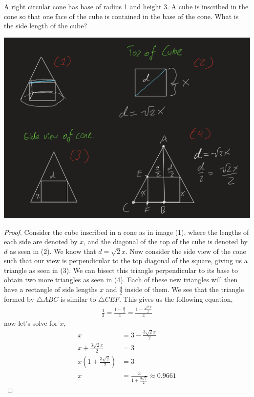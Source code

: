 \documentclass[11pt]{article}
\newenvironment{problem}[2][Problem\!]{\begin{trivlist}
\item[\hskip \labelsep {\bfseries #1}\hskip \labelsep {\bfseries #2}]}{\end{trivlist}}
\begin{document}
\newpage
\begin{tcolorbox}
    \begin{problem} {IC | 12-03 | PP 40}
        A right circular cone has base of radius 1 and height 3. A cube is inscribed in the cone so that one face of the cube is contained in the base of the cone. What is the side length of the cube?
    \end{problem}
\end{tcolorbox}
\includegraphics[scale=0.5]{diagram}
\begin{proof}
    Consider the cube inscribed in a cone as in image (1), where the lengths of each side are denoted by $x$, and the diagonal of the top of the cube is denoted by $d$ as seen in (2). We know that $d = \sqrt2 x$. Now consider the side view of the cone such that our view is perpendicular to the top diagonal of the square, giving us a triangle as seen in (3). We can bisect this triangle perpendicular to its base to obtain two more triangles as seen in (4). Each of these new triangles will then have a rectangle of side lengths $x$ and $\frac{d}{2}$ inside of them. We see that the triangle formed by $\triangle ABC$ is similar to $\triangle CEF$. This gives us the following equation,
    \begin{align*}
        \frac{1}{3} = \frac{1-\frac{d}{2}}{x} = \frac{1- \frac{\sqrt2 x}{2}}{x}
    \end{align*}
    now let's solve for $x$,
    \begin{align*}
        x &= 3 - \frac{3\sqrt2 x}{2}\\
        x + \frac{3\sqrt2 x}{2} &= 3 \\
        x(1 + \frac{3\sqrt 2}{2}) &= 3 \\
        x &= \frac{3}{1 + \frac{3\sqrt2}{2}} \approx 0.9661
    \end{align*}
\end{proof}
\end{document}
